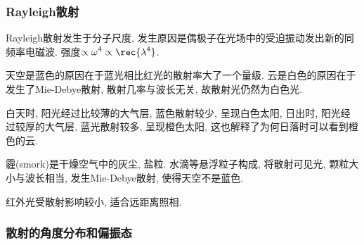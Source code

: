 \documentclass{ctexart}
\begin{document}

\subsubsection{Rayleigh散射} %
\label{ssub:rayleigh散射}

Rayleigh散射发生于分子尺度, 发生原因是偶极子在光场中的受迫振动发出新的同频率电磁波. 强度$\propto \displaystyle \omega^4 \propto \rec{\lambda^4}$.
\begin{ex}
    天空是蓝色的原因在于蓝光相比红光的散射率大了一个量级. 云是白色的原因在于发生了Mie-Debye散射, 散射几率与波长无关, 故散射光仍然为白色光.
\end{ex}
\begin{ex}
    白天时, 阳光经过比较薄的大气层, 蓝色散射较少, 呈现白色太阳, 日出时, 阳光经过较厚的大气层, 蓝光散射较多, 呈现橙色太阳, 这也解释了为何日落时可以看到橙色的云.
\end{ex}
\begin{ex}
    霾(smork)是干燥空气中的灰尘, 盐粒. 水滴等悬浮粒子构成, 将散射可见光, 颗粒大小与波长相当, 发生Mie-Debye散射, 使得天空不是蓝色.
\end{ex}
\begin{ex}
    红外光受散射影响较小, 适合远距离照相.
\end{ex}


\subsubsection{散射的角度分布和偏振态} %
\label{ssub:散射的角度分布和偏振态}
\end{document}
